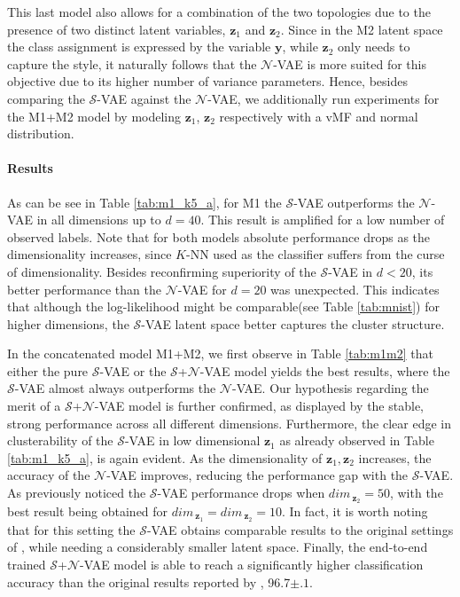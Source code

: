 \documentclass[letterpaper]{article}
\newcommand{\Sv}{$\mathcal{S}$}
\newcommand{\Nv}{$\mathcal{N}$}
\newcommand{\y}{\mathbf{y}}
\newcommand{\z}{\mathbf{z}}
\begin{document}
This last model also allows for a combination of the two topologies due to the presence of two distinct latent variables, $\z_1$ and $\z_2$. Since in the M2 latent space the class assignment is expressed by the variable $\y$, while $\z_2$ only needs to capture the style, it naturally follows that the \Nv-VAE is more suited for this objective due to its higher number of variance parameters. Hence, besides comparing the \Sv-VAE against the \Nv-VAE, we additionally run experiments for the M1+M2 model by modeling $\z_1$, $\z_2$ respectively with a vMF and normal distribution.

\paragraph{Results}

As can be see in Table \ref{tab:m1_k5_a}, for M1 the \Sv-VAE outperforms the \Nv-VAE in all dimensions up to $d=40$. This result is amplified for a low number of observed labels. Note that for both models absolute performance drops as the dimensionality increases, since $K$-NN used as the classifier suffers from the curse of dimensionality. Besides reconfirming superiority of the \Sv-VAE in $d < 20$, its better performance than the \Nv-VAE for $d=20$ was unexpected. This indicates that although the log-likelihood might be comparable(see Table \ref{tab:mnist}) for higher dimensions, the \Sv-VAE latent space better captures the cluster structure.

In the concatenated model M1+M2, we first observe in Table \ref{tab:m1m2} that either the pure \Sv-VAE or the \Sv+\Nv-VAE model yields the best results, where the \Sv-VAE almost always outperforms the \Nv-VAE. Our hypothesis regarding the merit of a \Sv+\Nv-VAE model is further confirmed, as displayed by the stable, strong performance across all different dimensions. Furthermore, the clear edge in clusterability of the \Sv-VAE in low dimensional $\z_1$ as already observed in Table \ref{tab:m1_k5_a}, is again evident. As the dimensionality of $\z_1, \z_2$ increases, the accuracy of the \Nv-VAE improves, reducing the performance gap with the \Sv-VAE. As previously noticed the \Sv-VAE performance drops when $dim_{\ \z_2} = 50$, with the best result being obtained for $dim_{\ \z_1} = dim_{\ \z_2} = 10$. In fact, it is worth noting that for this setting the \Sv-VAE obtains comparable results to the original settings of \citep{kingma-semi-super}, while needing a considerably smaller latent space. Finally, the end-to-end trained \Sv+\Nv-VAE model is able to reach a significantly higher classification accuracy than the original results reported by \citet{kingma-semi-super}, 96.7{\tiny$\pm.1$}.
\end{document}
